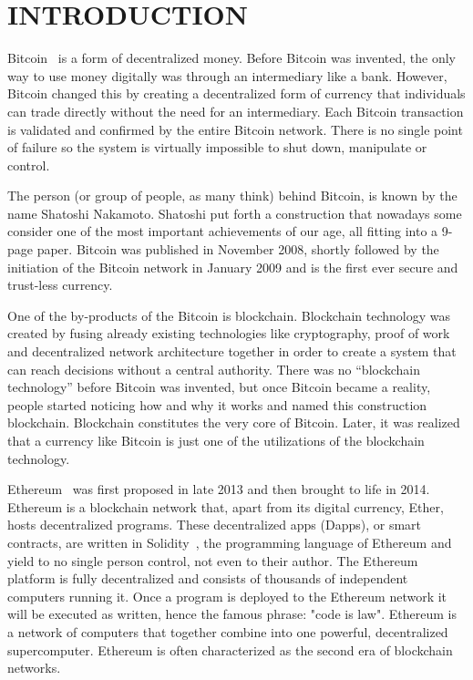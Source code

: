\chapter{INTRODUCTION}

Bitcoin~\cite{nakamoto} is a form of decentralized money. Before Bitcoin was
invented, the only way to use money digitally was through an intermediary like
a bank. However, Bitcoin changed this by creating a decentralized form of
currency that individuals can trade directly without the need for an
intermediary. Each Bitcoin transaction is validated and confirmed by the entire
Bitcoin network.  There is no single point of failure so the system is
virtually impossible to shut down, manipulate or control.

The person (or group of people, as many think) behind Bitcoin, is known by the
name Shatoshi Nakamoto. Shatoshi put forth a construction that nowadays some
consider one of the most important achievements of our age, all fitting into a
9-page paper.  Bitcoin was published in November 2008, shortly followed by the
initiation of the Bitcoin network in January 2009 and is the first ever secure
and trust-less currency.

One of the by-products of the Bitcoin is blockchain. Blockchain technology was
created by fusing already existing technologies like cryptography, proof of
work and decentralized network architecture together in order to create a
system that can reach decisions without a central authority. There was no
“blockchain technology” before Bitcoin was invented, but once Bitcoin became a
reality, people started noticing how and why it works and named this
construction blockchain. Blockchain constitutes the very core of Bitcoin.
Later, it was realized that a currency like Bitcoin is just one of the
utilizations of the blockchain technology.

Ethereum~\cite{wood, buterin} was first proposed in late 2013 and then brought
to life in 2014.  Ethereum is a blockchain network that, apart from its digital
currency, Ether, hosts decentralized programs. These decentralized apps
(Dapps), or smart contracts, are written in Solidity~\cite{solidity}, the
programming language of Ethereum and yield to no single person control, not
even to their author.  The Ethereum platform is fully decentralized and
consists of thousands of independent computers running it. Once a program is
deployed to the Ethereum network it will be executed as written, hence the
famous phrase: "code is law".  Ethereum is a network of computers that together
combine into one powerful, decentralized supercomputer. Ethereum is often
characterized as the second era of blockchain networks.

